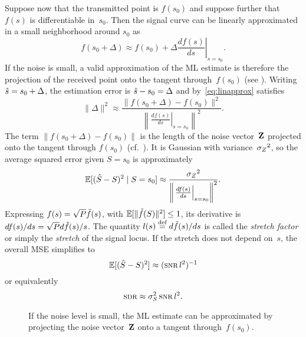 Suppose now that the transmitted point is $f(s_0)$ and suppose further that
$f(s)$ is differentiable in~$s_0$. Then the signal curve can be linearly
approximated in a small neighborhood around $s_0$ as
\begin{equation}
  \label{eq:linapprox}
  f(s_0 + \Delta) \approx f(s_0) + \Delta \left. \frac{df(s)}{ds}\right|_{s =
  s_0}.
\end{equation}
If the noise is small, a valid approximation of the ML estimate is therefore
the projection of the received point onto the tangent through~$f(s_0)$ (see
). Writing ${\hat{s}} = s_0 + \Delta$, the estimation error is
${\hat{s}} - s_0 = \Delta$ and by~\eqref{eq:linapprox} satisfies
\begin{equation*}
  \| \Delta \|^2 \approx \frac{\| f(s_0 + \Delta) - f(s_0) \|^2}
  {\left\| \left. \frac{d f(s)}{ds} \right|_{s = s_0} \right\|^2}.
\end{equation*}
The term $\| f(s_0 + \Delta) - f(s_0) \|$ is the length of the noise
vector~$\mathbf{Z}$ projected onto the tangent through $f(s_0)$
(cf.~). It is Gaussian with variance~${{\sigma_Z}^2}$, so the average
squared error given $S = s_0$ is approximately
\begin{equation}
  \label{eq:errorlinapprox}
  \mathbb{E}[({\hat{S}} - S)^2 \mid S = s_0] \approx \frac{{{\sigma_Z}^2}}{\left\| \left. \frac{df(s)}{ds}
  \right|_{s=s_0} \right\|^2}.
\end{equation}
Expressing $f(s) = \sqrt{P} \tilde{f}(s)$, with $\mathbb{E}[\|\tilde{f}(S)\|^2] \le 1$, its
derivative is
$df(s)/ds = \sqrt{P} d\tilde{f}(s)/s$. The quantity $l(s) \stackrel{\text{def}}{=} d\tilde{f}(s)/ds$ is called
the \emph{stretch factor} or simply the \emph{stretch} of the signal locus. If
the stretch does not depend on~$s$, the overall MSE simplifies to
\begin{equation}
  \label{eq:constantstretch}
  \mse \approx (\snr l^2)^{-1}
\end{equation}
or equivalently
\begin{equation}
  \label{eq:sdrconstantstretch}
  \sdr \approx \ssq\snr l^2.
\end{equation}

\begin{figure}
  \begin{center}
    
  \end{center}
  \caption{If the noise level is small, the ML estimate can be approximated
  by projecting the noise vector~$\mathbf{Z}$ onto a tangent through~$f(s_0)$.}
  \label{fig:tangentproj}
\end{figure}

